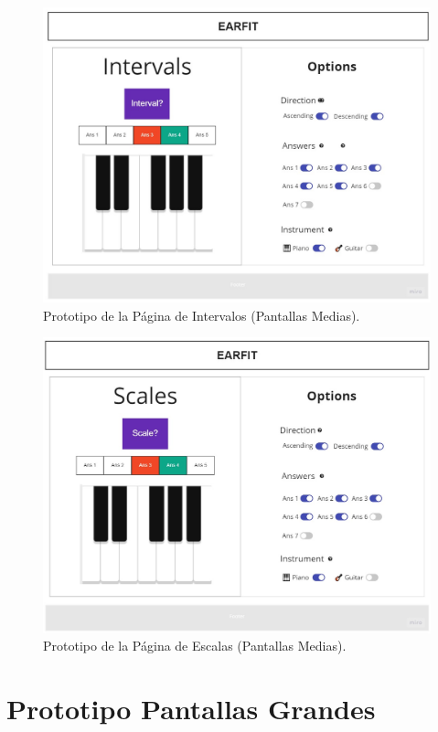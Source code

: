 \documentclass[12pt,twoside,titlepage]{report}
\begin{document}
{\begin{figure}[H]
    \centering
    \includegraphics[scale=0.3]{Design Thinking/Prototipo/Medium/Intervals}
    \caption{Prototipo de la Página de Intervalos (Pantallas Medias).}
    \label{fig:Intervals}
\end{figure}

\begin{figure}[H]
    \centering
    \includegraphics[scale=0.3]{Design Thinking/Prototipo/Medium/Scales}
    \caption{Prototipo de la Página de Escalas (Pantallas Medias).}
    \label{fig:Scales}
\end{figure}

\section{Prototipo Pantallas Grandes}

}
\end{document}
